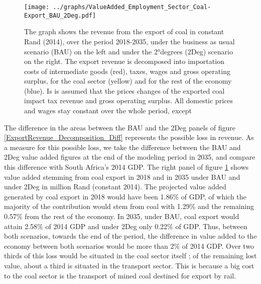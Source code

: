 \documentclass[12pt,english]{article}
\begin{document}
\begin{figure}[!t]
	\centering
	\hspace{-10pt}\texttt{[image: ../graphs/ValueAdded\_Employment\_Sector\_Coal-Export\_BAU\_2Deg.pdf]}
	\caption{\label{ValueAdded_Employment_Sector_Coal-Export_BAU_2Deg}\small The graph shows the revenue from the export of coal in constant Rand (2014), over the period 2018-2035, under the business as usual scenario (BAU) on the left and under the 2°degrees (2Deg) scenario on the right. The export revenue is decomposed into importation costs of intermediate goods (red), taxes, wages and gross operating surplus, for the coal sector (yellow) and for the rest of the economy (blue). Is is assumed that the prices changes of the exported coal impact tax revenue and gross operating surplus. All domestic prices and wages stay constant over the whole period, except  }
\end{figure}

The difference in the areas between the BAU and the 2Deg panels of figure \ref{ExportRevenue_Decomposition_Diff} represents the possible loss in revenue. As a measure for this possible loss, we take the difference between the BAU and 2Deg value added figures at the end of the modeling period in 2035, and compare this difference with South Africa's 2014 GDP. %
The right panel of figure \ref{ValueAdded_Employment_Sector_Coal-Export_BAU_2Deg} shows value added stemming from coal export in 2018 and in 2035 under BAU and under 2Deg in million Rand (constant 2014). %
The projected value added generated by coal export in 2018 would have been 1.86\% of GDP, of which the majority of the contribution would stem from coal with 1.29\% and the remaining 0.57\% from the rest of the economy. In 2035, under BAU, coal export would attain 2.58\% of 2014 GDP and under 2Deg only 0.22\% of GDP. Thus, between both scenarios, towards the end of the period, the difference in value added to the economy between both scenarios would be more than 2\% of 2014 GDP. Over two thirds of this loss would be situated in the coal sector itself ; of the remaining lost value, about a third is situated in the transport sector. This is because a big cost to the coal sector is the transport of mined coal destined for export by rail. 
\end{document}
